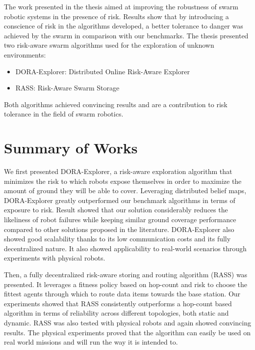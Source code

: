 \label{sec:Conclusion}
The work presented in the thesis aimed at improving the robustness of swarm robotic systems in the presence of risk. Results show that by introducing a conscience of risk in the algorithms developed, a better tolerance to danger was achieved by the swarm in comparison with our benchmarks. The thesis presented two risk-aware swarm algorithms used for the exploration of unknown environments:

\begin{itemize}
    \item DORA-Explorer: Distributed Online Risk-Aware Explorer
    \item RASS: Risk-Aware Swarm Storage
\end{itemize}

Both algorithms achieved convincing results and are a contribution to risk tolerance in the field of swarm robotics. 

\section{Summary of Works}
We first presented DORA-Explorer, a risk-aware exploration
algorithm that minimizes the risk to which robots expose themselves in
order to maximize the amount of ground they will be able to cover. Leveraging distributed belief maps, DORA-Explorer greatly outperformed our benchmark algorithms in terms of exposure to risk. Result showed that our solution considerably reduces the likeliness of robot failures while keeping similar ground coverage performance compared to other solutions proposed in
the literature. DORA-Explorer also showed good scalability thanks to its low
communication costs and its fully decentralized nature. It also showed applicability to real-world scenarios through experiments with physical robots. 

Then, a fully decentralized risk-aware storing and routing algorithm (RASS) was presented. It leverages a fitness policy based on hop-count and risk to choose the fittest agents through which to route data items towards the base station. Our experiments showed that RASS consistently outperforms a hop-count based algorithm in terms of reliability across different topologies, both static and dynamic. RASS was also tested with physical robots and again showed convincing results. The physical experiments proved that the algorithm can easily be used on real world missions and will run the way it is intended to.

